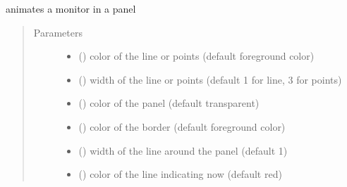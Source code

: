 \documentclass[letterpaper,10pt,english]{sphinxmanual}
\begin{document}

\begin{fulllineitems}
\label{\detokenize{Reference:salabim.AnimateMonitor}}
animates a monitor in a panel
\begin{quote}\begin{description}
\item[{Parameters}] \leavevmode\begin{itemize}
\item {} 
 () \textendash{} color of the line or points (default foreground color)

\item {} 
 () \textendash{} width of the line or points (default 1 for line, 3 for points)

\item {} 
 () \textendash{} color of the panel (default transparent)

\item {} 
 () \textendash{} color of the border (default foreground color)

\item {} 
 () \textendash{} width of the line around the panel (default 1)

\item {} 
 () \textendash{} color of the line indicating now (default red)


\end{itemize}
\end{description}
\end{quote}
\end{fulllineitems}
\end{document}
